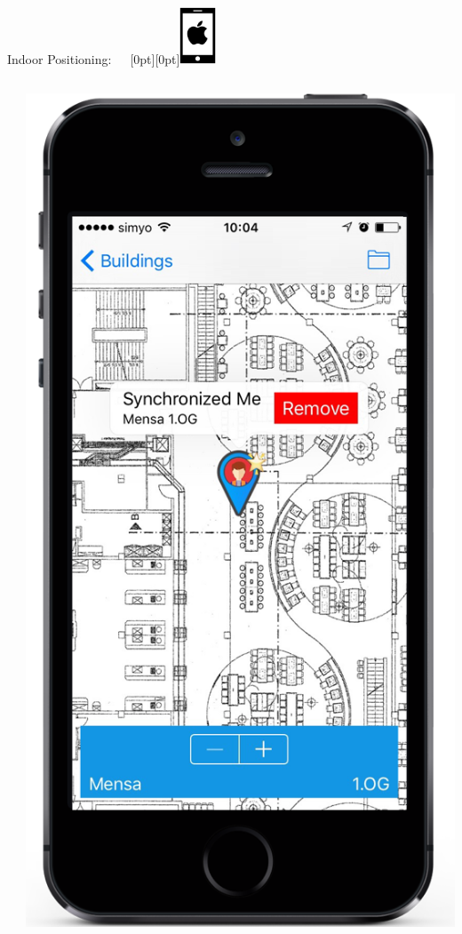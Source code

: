 \documentclass[11pt]{beamer}
\begin{document}
\begin{frame}{Indoor Positioning:~~~\raisebox{-10pt}[0pt][0pt]{\includegraphics[width=0.08\textwidth]{tech-stack-apple}}}
\begin{columns}[T]
\begin{column}{.6\textwidth}
\begin{itemize}
  \end{itemize}
  \end{column}
  \begin{column}{.4\textwidth}
  \includegraphics[scale=0.25]{mappinpointd}
  \end{column}
\end{columns}

\end{frame}
\end{document}

